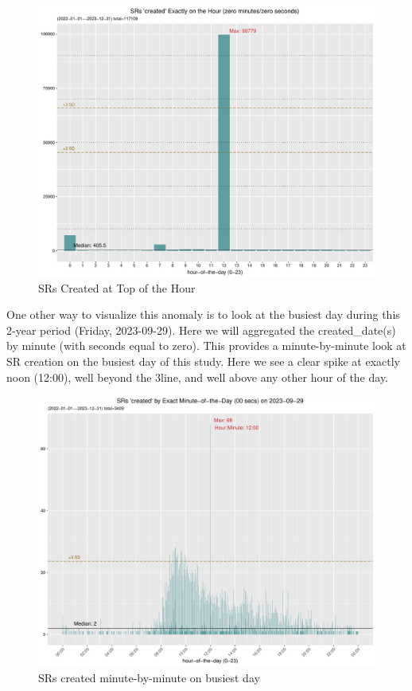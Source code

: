 \documentclass[12pt, titlepage]{article}
\begin{document}
{	\begin{figure}[H]
		 \centering
		 \includegraphics[width = \textwidth]{SR_created_by_top_of_hour.pdf}
		 \caption{SRs Created at Top of the Hour}
		 \label{fig:tophourcreated}
	\end{figure}	

	One other way to visualize this anomaly is to look at the busiest day during this 2-year period (Friday, 2023-09-29).
	Here we will aggregated the created\_date(s) by minute (with seconds equal to zero). This provides a 
	minute-by-minute look at SR creation on the busiest day of this study. Here we see a clear spike at 
	exactly noon (12:00), well beyond the 3\textsigma line, and well above any other hour of the day.
	
	\begin{figure}[H]
		 \centering
		 \includegraphics[width=\textwidth]{SR_created_by_minute_of_busiest_day.pdf}
		 \caption{SRs created minute-by-minute on busiest day}
		 \label{fig:busiestcreated}
	\end{figure}	

}
\end{document}
